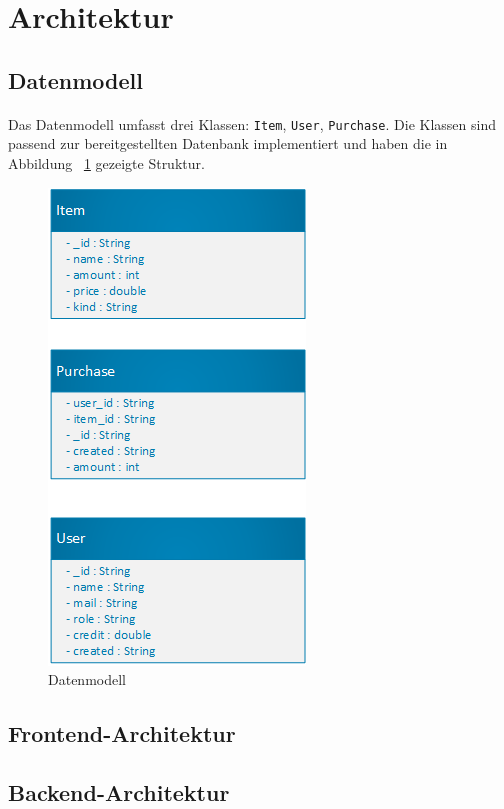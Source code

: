 \documentclass{scrartcl}
\begin{document}
	\section{Architektur} \label{architecture}
		\subsection{Datenmodell} \label{architecture::datamodel}
			\paragraph*{}
			Das Datenmodell umfasst drei Klassen: \texttt{Item}, \texttt{User}, \texttt{Purchase}. Die Klassen sind passend zur bereitgestellten Datenbank implementiert und haben die in Abbildung ~\ref{datamodel} gezeigte Struktur.
		
			\begin{figure}[!h]
				\centering
				\includegraphics[scale=0.5]{./figures/datamodel.png}
				\caption{Datenmodell}
				\label{datamodel}
			\end{figure}
		
		\subsection{Frontend-Architektur} \label{architecture::frontend}
		
		\subsection{Backend-Architektur} \label{architecture::backend}
\end{document}
